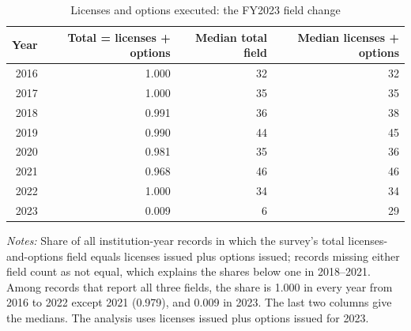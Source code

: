 \begin{table}[htbp]\centering
\caption{Licenses and options executed: the FY2023 field change}\label{tab:licfield}
\begin{threeparttable}\footnotesize
\begin{tabular}{rrrr}\toprule
Year & Total = licenses + options & Median total field & Median licenses + options \\\midrule
2016 & 1.000 & 32 & 32 \\
2017 & 1.000 & 35 & 35 \\
2018 & 0.991 & 36 & 38 \\
2019 & 0.990 & 44 & 45 \\
2020 & 0.981 & 35 & 36 \\
2021 & 0.968 & 46 & 46 \\
2022 & 1.000 & 34 & 34 \\
2023 & 0.009 & 6 & 29 \\
\bottomrule
\end{tabular}
\begin{tablenotes}[flushleft]\footnotesize
\item \textit{Notes:} Share of all institution-year records in which the survey's total licenses-and-options field equals licenses issued plus options issued; records missing either field count as not equal, which explains the shares below one in 2018--2021. Among records that report all three fields, the share is 1.000 in every year from 2016 to 2022 except 2021 (0.979), and 0.009 in 2023. The last two columns give the medians. The analysis uses licenses issued plus options issued for 2023.
\end{tablenotes}
\end{threeparttable}
\end{table}

